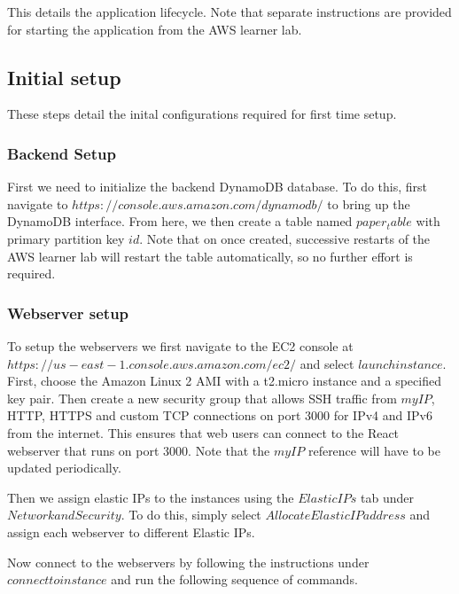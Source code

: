 \documentclass[12pt]{article}
\begin{document}
This details the application lifecycle. Note that separate instructions are provided for starting the application from the AWS learner lab. 

\subsection{Initial setup}

These steps detail the inital configurations required for first time setup.

\subsubsection{Backend Setup}

First we need to initialize the backend DynamoDB database. To do this, first navigate to $https://console.aws.amazon.com/dynamodb/$ to bring up the DynamoDB interface. From here, we then create a table named $paper_table$ with primary partition key $id$. Note that on once created, successive restarts of the AWS learner lab will restart the table automatically, so no further effort is required. 

\subsubsection{Webserver setup}

To setup the webservers we first navigate to the EC2 console at $https://us-east-1.console.aws.amazon.com/ec2/$ and select $launch instance$. First, choose the Amazon Linux 2 AMI with a t2.micro instance and a specified key pair. Then create a new security group that allows SSH traffic from $myIP$, HTTP, HTTPS and custom TCP connections on port 3000 for IPv4 and IPv6 from the internet. This ensures that web users can connect to the React webserver that runs on port 3000. Note that the $myIP$ reference will have to be updated periodically. 

Then we assign elastic IPs to the instances using the $Elastic IPs$ tab under $Network and Security$. To do this, simply select $Allocate Elastic IP address$ and assign each webserver to different Elastic IPs.

Now connect to the webservers by following the instructions under $connect to instance$ and run the following sequence of commands. 
\end{document}
